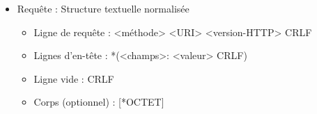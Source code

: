 \documentclass[11pt,twoside,a4paper]{article}
\begin{document}
\begin{landscape}
\begin{multicols}{2}
\begin{itemize}
		\item Requ{\^e}te : Structure textuelle normalis{\'e}e
		\begin{itemize}
			\item Ligne de requ{\^e}te : <m{\'e}thode> <URI> <version-HTTP> CRLF
			\item Lignes d'en-t{\^e}te : *(<champs>: <valeur> CRLF)
			\item Ligne vide : CRLF
			\item Corps (optionnel) : [*OCTET]
		\end{itemize}
	\end{itemize}
	
	~\\
	
	\columnbreak
	
	\begin{itemize}


\end{itemize}
\end{multicols}
\end{landscape}
\end{document}
